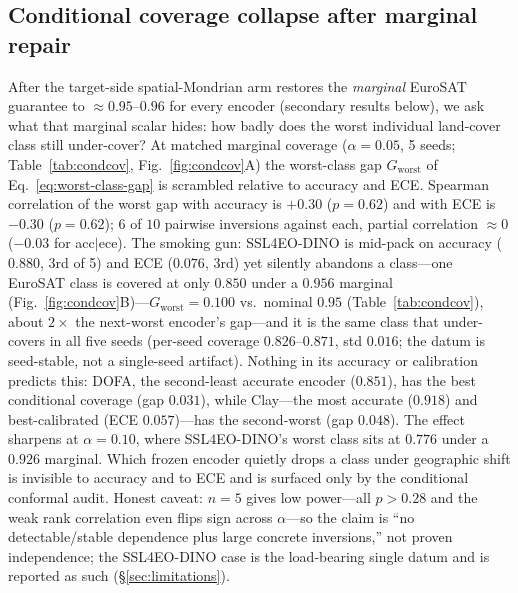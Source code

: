 \documentclass[preprint,11pt,authoryear]{elsarticle}
\begin{document}
\subsection*{Conditional coverage collapse after marginal repair}
After the target-side spatial-Mondrian arm restores the \emph{marginal} EuroSAT guarantee to
$\approx0.95$--$0.96$ for every encoder (secondary results below), we ask what that marginal scalar hides:
how badly does the worst individual land-cover class still under-cover? At matched marginal coverage
($\alpha{=}0.05$, 5 seeds; Table~\ref{tab:condcov}, Fig.~\ref{fig:condcov}A) the worst-class gap
$G_{\mathrm{worst}}$ of Eq.~\eqref{eq:worst-class-gap} is scrambled relative to
accuracy and ECE. Spearman correlation of the worst gap with accuracy is $+0.30$ ($p{=}0.62$) and with
ECE is $-0.30$ ($p{=}0.62$); $6$ of $10$ pairwise inversions
against each, partial correlation $\approx0$ ($-0.03$ for acc$\mid$ece). The smoking gun: SSL4EO-DINO is
mid-pack on accuracy ($0.880$, 3rd of 5) and ECE ($0.076$, 3rd) yet silently abandons a class---one
EuroSAT class is covered at only $0.850$ under a $0.956$ marginal (Fig.~\ref{fig:condcov}B)---$G_{\mathrm{worst}}=0.100$
vs.\ nominal $0.95$ (Table~\ref{tab:condcov}), about $2\times$ the next-worst encoder's gap---and it is the same class that under-covers in all
five seeds (per-seed coverage $0.826$--$0.871$, std $0.016$; the datum is seed-stable, not a single-seed
artifact). Nothing in its accuracy or calibration predicts this:
DOFA, the second-least accurate encoder ($0.851$), has the best conditional coverage (gap
$0.031$), while Clay---the most accurate ($0.918$) and best-calibrated (ECE $0.057$)---has the
second-worst (gap $0.048$). The effect sharpens at $\alpha{=}0.10$, where SSL4EO-DINO's worst class
sits at $0.776$ under a $0.926$ marginal. Which frozen encoder quietly drops a class under geographic shift
is invisible to accuracy and to ECE and is surfaced only by the conditional conformal audit. Honest
caveat: $n{=}5$ gives low power---all $p>0.28$ and the weak rank correlation even flips sign across
$\alpha$---so the claim is ``no detectable/stable dependence plus large concrete inversions,'' not proven
independence; the SSL4EO-DINO case is the load-bearing single datum and is reported as such
(\S\ref{sec:limitations}).
\end{document}
